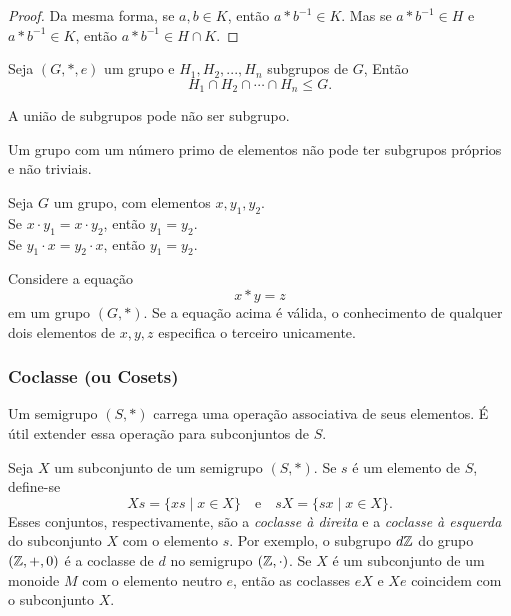\begin{definition}[Magma]
\begin{theorem}
\begin{proof}
               Da mesma forma, se $a,b \in K$, então $a * b^{-1} \in K$. Mas se $a * b^{-1} \in H$ e $a * b^{-1} \in K$, então $a * b^{-1} \in H \cap K$.
            \end{proof}
         \end{theorem}
         \begin{theorem}
            Seja $(G, *, e)$ um grupo e $H_{1},H_{2}, ..., H_{n}$ subgrupos de $G$, Então $$ H_{1} \cap H_{2} \cap \cdots \cap H_{n} \leq G.$$
         \end{theorem}
         \begin{stat}
            A união de subgrupos pode não ser subgrupo.
         \end{stat}
         \begin{stat}
            Um grupo com um número primo de elementos não pode ter subgrupos próprios e não triviais.
         \end{stat}
         \begin{stat}
            Seja $G$ um grupo, com elementos $x,y_{1},y_{2}$.\\
            Se $x\cdot y_{1} = x\cdot y_{2}$, então $y_{1} = y_{2}$.\\
            Se $y_{1}\cdot x = y_{2}\cdot x$, então $y_{1} = y_{2}$.
         \end{stat}
            \begin{corollary}\label{UnicSolu}
            Considere a equação $$x * y = z$$
            em um grupo $(G,*)$. Se a equação acima é válida, o conhecimento de qualquer dois elementos de $x,y,z$ especifica o terceiro unicamente.
         \end{corollary}

      \subsubsection{Coclasse (ou Cosets)}
         Um semigrupo $(S,*)$ carrega uma operação associativa de seus elementos. É útil extender essa operação para subconjuntos de $S$.

         Seja $X$ um subconjunto de um semigrupo $(S,*)$. Se $s$ é um elemento de $S$, define-se $$ Xs = \{xs \mid x \in X\}\quad \textrm{e}\quad sX = \{sx \mid x \in X\}.$$
         Esses conjuntos, respectivamente, são a \emph{coclasse à direita} e a \emph{coclasse à esquerda} do subconjunto $X$ com o elemento $s$. Por exemplo, o subgrupo $d\mathbb{Z}$ do grupo $(\mathbb{Z},+,0)$ é a coclasse de $d$ no semigrupo $(\mathbb{Z},\cdot)$.
         Se $X$ é um subconjunto de um monoide $M$ com o elemento neutro $e$, então as coclasses $eX$ e $Xe$ coincidem com o subconjunto $X$.


\end{definition}
